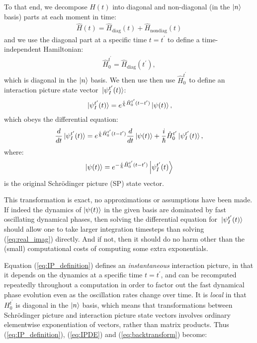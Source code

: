 To that end, we decompose $H(t)$ into diagonal and non-diagonal (in the $\ket{n}$ basis) parts at each moment in time:
\begin{align}
\hat H(t) = \hat H_{\mathrm{diag}}(t) + \hat H_{\mathrm{nondiag}}(t)
\end{align}
and we use the diagonal part at a specific time $t=t^\prime$ to define a time-independent Hamiltonian:
\begin{align}\label{eq:H0def}
 \hat H_0^{t^\prime} = \hat H_{\mathrm{diag}}(t^\prime),
\end{align}
which is diagonal in the $\ket{n}$ basis. We then use then use $\hat H_0^{t^\prime}$ to define an interaction picture state vector $\ket*{\psi_I^{t^\prime}(t)}$:
\begin{align}\label{eq:IP_definition}
\ket*{\psi_I^{t^\prime}(t)} = e^{\frac i \hbar \hat H_0^{t^\prime}(t - t^\prime)}\ket{\psi(t)},
\end{align}
which obeys the differential equation:
\begin{align}\label{eq:IPDE}
\frac d {dt} \ket*{\psi_I^{t^\prime}(t)}
    = e^{\frac i \hbar \hat H_0^{t^\prime}(t - t^\prime)}\frac d {dt} \ket{\psi(t)}
      + \frac i\hbar \hat H_0^{t^\prime}\ket*{\psi_I^{t^\prime}(t)},
\end{align}
where:
\begin{align}\label{eq:backtransform}
\ket{\psi(t)} = e^{-\frac i \hbar \hat H_0^{t^\prime}(t - t^\prime)}\ket{\psi_I^{t^\prime}(t)}
\end{align}
is the original Schrödinger picture (SP) state vector.

This transformation is exact, no approximations or assumptions have been made. If indeed the dynamics of $\ket{\psi(t)}$ in the given basis are dominated by fast oscillating dynamical phases, then solving the differential equation for $\ket*{\psi_I^{t^\prime}(t)}$ should allow one to take larger integration timesteps than solving (\ref{eq:real_imag}) directly. And if not, then it should do no harm other than the (small) computational costs of computing some extra exponentials.

Equation (\ref{eq:IP_definition}) defines an \emph{instantaneous} interaction picture, in that it depends on the dynamics at a specific time $t=t^\prime$, and can be recomputed repeatedly throughout a computation in order to factor out the fast dynamical phase evolution even as the oscillation rates change over time. It is \emph{local} in that $H_0^{t^\prime}$ is diagonal in the $\ket{n}$ basis, which means that transformations between Schrödinger picture and interaction picture state vectors involves ordinary elementwise exponentiation of vectors, rather than matrix products. Thus (\ref{eq:IP_definition}), (\ref{eq:IPDE}) and (\ref{eq:backtransform}) become:

